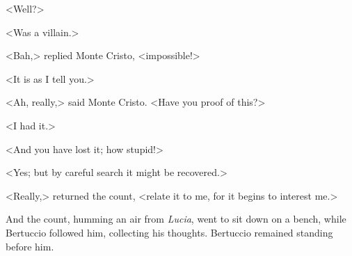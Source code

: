  <Well?> 

 <Was a villain.> 

 <Bah,> replied Monte Cristo, <impossible!> 

 <It is as I tell you.> 

 <Ah, really,> said Monte Cristo. <Have you proof of this?> 

 <I had it.> 

 <And you have lost it; how stupid!> 

 <Yes; but by careful search it might be recovered.> 

 <Really,> returned the count, <relate it to me, for it begins to interest me.> 

 And the count, humming an air from \textit{Lucia}, went to sit down on a bench, while Bertuccio followed him, collecting his thoughts. Bertuccio remained standing before him. 